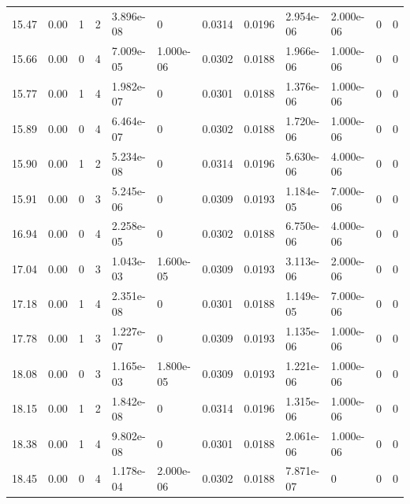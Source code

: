 \documentclass[preview]{standalone}
\begin{document}
{{{\begin{tabular}{L{1.2cm}C{1.2cm} C{0.3cm}C{0.5cm} C{1.4cm}C{1.4cm} C{1.4cm}C{1.4cm} C{1.6cm}C{1.6cm} C{1.6cm}C{1.6cm}}
  15.47  &  0.00  & 1     &  2 &  3.896e-08  & 0  &  0.0314&   0.0196& 2.954e-06 & 2.000e-06   &  0 & 0  \\ 
  15.66  &  0.00  & 0     &  4 &  7.009e-05  & 1.000e-06  &  0.0302&   0.0188& 1.966e-06 & 1.000e-06   &  0 & 0  \\ 
  15.77  &  0.00  & 1     &  4 &  1.982e-07  & 0  &  0.0301&   0.0188& 1.376e-06 & 1.000e-06   &  0 & 0  \\ 
  15.89  &  0.00  & 0     &  4 &  6.464e-07  & 0  &  0.0302&   0.0188& 1.720e-06 & 1.000e-06   &  0 & 0  \\ 
  15.90  &  0.00  & 1     &  2 &  5.234e-08  & 0  &  0.0314&   0.0196& 5.630e-06 & 4.000e-06   &  0 & 0  \\ 
  15.91  &  0.00  & 0     &  3 &  5.245e-06  & 0  &  0.0309&   0.0193& 1.184e-05 & 7.000e-06   &  0 & 0  \\ 
  16.94  &  0.00  & 0     &  4 &  2.258e-05  & 0  &  0.0302&   0.0188& 6.750e-06 & 4.000e-06   &  0 & 0  \\ 
  17.04  &  0.00  & 0     &  3 &  1.043e-03  & 1.600e-05  &  0.0309&   0.0193& 3.113e-06 & 2.000e-06   &  0 & 0  \\ 
  17.18  &  0.00  & 1     &  4 &  2.351e-08  & 0  &  0.0301&   0.0188& 1.149e-05 & 7.000e-06   &  0 & 0  \\ 
  17.78  &  0.00  & 1     &  3 &  1.227e-07  & 0  &  0.0309&   0.0193& 1.135e-06 & 1.000e-06   &  0 & 0  \\ 
  18.08  &  0.00  & 0     &  3 &  1.165e-03  & 1.800e-05  &  0.0309&   0.0193& 1.221e-06 & 1.000e-06   &  0 & 0  \\ 
  18.15  &  0.00  & 1     &  2 &  1.842e-08  & 0  &  0.0314&   0.0196& 1.315e-06 & 1.000e-06   &  0 & 0  \\ 
  18.38  &  0.00  & 1     &  4 &  9.802e-08  & 0  &  0.0301&   0.0188& 2.061e-06 & 1.000e-06   &  0 & 0  \\ 
  18.45  &  0.00  & 0     &  4 &  1.178e-04  & 2.000e-06  &  0.0302&   0.0188& 7.871e-07 & 0   &  0 & 0  \\ 
\hline 
\end{tabular} 

}}}
\end{document}
